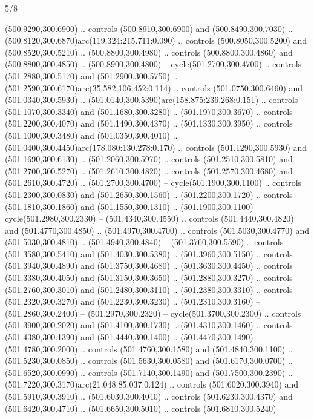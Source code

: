 \begin{flagdescription}{5/8}
\begin{scope}[xshift=0.5\flaglength,yshift=0.5\flagwidth,scale=\flagwidth/475.63]
\begin{scope}[y=0.8pt, x=0.8pt, yscale=-1, xscale=1,shift={(-450,-300)}]
\begin{scope}[cm={{1.0,0.0,0.0,1.0,(-0.0002,0.12556)}},cm={{1.0,0.0,0.0,1.0,(0.00179,0.0)}}]
\begin{scope}[cm={{1.11592,0.0,0.0,1.11592,(-106.89933,-41.77764)}}]
\begin{scope}[draw=black,fill=cfff]
\begin{scope}[fill=black]
  (500.9290,300.6900) .. controls (500.8910,300.6900) and (500.8490,300.7030) ..
  (500.8120,300.6870)arc(119.324:215.711:0.090) .. controls (500.8050,300.5200)
  and (500.8520,300.5210) .. (500.8800,300.4980) .. controls (500.8800,300.4860)
  and (500.8800,300.4850) .. (500.8900,300.4800) -- cycle(501.2700,300.4700) ..
  controls (501.2880,300.5170) and (501.2900,300.5750) ..
  (501.2590,300.6170)arc(35.582:106.452:0.114) .. controls (501.0750,300.6460)
  and (501.0340,300.5930) .. (501.0140,300.5390)arc(158.875:236.268:0.151) ..
  controls (501.1070,300.3340) and (501.1680,300.3280) .. (501.1970,300.3670) ..
  controls (501.2200,300.4070) and (501.1490,300.4370) .. (501.1330,300.3950) ..
  controls (501.1000,300.3480) and (501.0350,300.4010) ..
  (501.0400,300.4450)arc(178.080:130.278:0.170) .. controls (501.1290,300.5930)
  and (501.1690,300.6130) .. (501.2060,300.5970) .. controls (501.2510,300.5810)
  and (501.2700,300.5270) .. (501.2610,300.4820) .. controls (501.2570,300.4680)
  and (501.2610,300.4720) .. (501.2700,300.4700) -- cycle(501.1900,300.1100) ..
  controls (501.2300,300.0830) and (501.2650,300.1560) .. (501.2200,300.1720) ..
  controls (501.1810,300.1860) and (501.1550,300.1310) .. (501.1900,300.1100) --
  cycle(501.2980,300.2330) -- (501.4340,300.4550) .. controls
  (501.4440,300.4820) and (501.4770,300.4850) .. (501.4970,300.4700) .. controls
  (501.5030,300.4770) and (501.5030,300.4810) .. (501.4940,300.4840) --
  (501.3760,300.5590) .. controls (501.3580,300.5410) and (501.4030,300.5380) ..
  (501.3960,300.5150) .. controls (501.3940,300.4890) and (501.3750,300.4680) ..
  (501.3630,300.4450) .. controls (501.3380,300.4050) and (501.3150,300.3650) ..
  (501.2880,300.3270) .. controls (501.2760,300.3010) and (501.2480,300.3110) ..
  (501.2380,300.3310) .. controls (501.2320,300.3270) and (501.2230,300.3230) ..
  (501.2310,300.3160) -- (501.2860,300.2400) -- (501.2970,300.2320) --
  cycle(501.3700,300.2300) .. controls (501.3900,300.2020) and
  (501.4100,300.1730) .. (501.4310,300.1460) .. controls (501.4380,300.1390) and
  (501.4440,300.1400) .. (501.4470,300.1490) -- (501.4780,300.2000) .. controls
  (501.4760,300.1580) and (501.4840,300.1100) .. (501.5230,300.0850) .. controls
  (501.5630,300.0580) and (501.6170,300.0700) .. (501.6520,300.0990) .. controls
  (501.7140,300.1490) and (501.7500,300.2390) ..
  (501.7220,300.3170)arc(21.048:85.037:0.124) .. controls (501.6020,300.3940)
  and (501.5910,300.3910) .. (501.6030,300.4040) .. controls (501.6230,300.4370)
  and (501.6420,300.4710) .. (501.6650,300.5010) .. controls (501.6810,300.5240)

\end{scope}
\end{scope}
\end{scope}
\end{scope}
\end{scope}
\end{scope}
\end{flagdescription}
